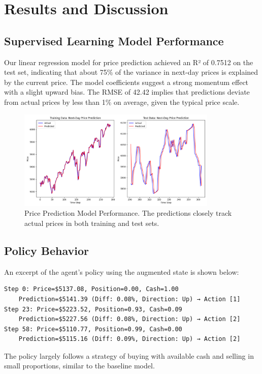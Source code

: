 \documentclass[11pt]{article}
\begin{document}
\section{Results and Discussion}
\subsection{Supervised Learning Model Performance}
Our linear regression model for price prediction achieved an R² of 0.7512 on the test set, indicating that about 75\% of the variance in next-day prices is explained by the current price. The model coefficients suggest a strong momentum effect with a slight upward bias. The RMSE of 42.42 implies that predictions deviate from actual prices by less than 1\% on average, given the typical price scale.

\begin{figure}[h]
  \centering
  \includegraphics[width=0.85\textwidth]{fig/m2_prediction.png}
  \caption{Price Prediction Model Performance. The predictions closely track actual prices in both training and test sets.}
  \label{fig:prediction_results}
\end{figure}

\subsection{Policy Behavior}
An excerpt of the agent's policy using the augmented state is shown below:
\begin{verbatim}
Step 0: Price=$5137.08, Position=0.00, Cash=1.00
    Prediction=$5141.39 (Diff: 0.08%, Direction: Up) → Action [1]
Step 23: Price=$5223.52, Position=0.93, Cash=0.09
    Prediction=$5227.56 (Diff: 0.08%, Direction: Up) → Action [2]
Step 58: Price=$5110.77, Position=0.99, Cash=0.00
    Prediction=$5115.16 (Diff: 0.09%, Direction: Up) → Action [2]
\end{verbatim}
The policy largely follows a strategy of buying with available cash and selling in small proportions, similar to the baseline model.
\end{document}
